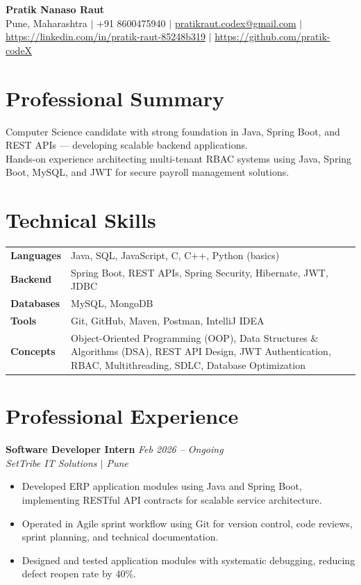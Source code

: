 \documentclass[10.5pt,a4paper]{article}
\begin{document}
\begin{center}
{\Large\bfseries Pratik Nanaso Raut}\\[2pt]
Pune, Maharashtra $|$ +91 8600475940 $|$ \href{mailto:pratikraut.codex@gmail.com}{pratikraut.codex@gmail.com} $|$ \href{https://linkedin.com/in/pratik-raut-85248b319}{https://linkedin.com/in/pratik-raut-85248b319} $|$ \href{https://github.com/pratik-codeX}{https://github.com/pratik-codeX}
\end{center}
\vspace{-2pt}
\section{Professional Summary}
Computer Science candidate with strong foundation in Java, Spring Boot, and REST APIs — developing scalable backend applications.\\[2pt]
Hands-on experience architecting multi-tenant RBAC systems using Java, Spring Boot, MySQL, and JWT for secure payroll management solutions.
\section{Technical Skills}
\begin{tabular}{@{}p{}p{}@{}}
\textbf{Languages} & Java, SQL, JavaScript, C, C++, Python (basics) \\[1pt]
\textbf{Backend} & Spring Boot, REST APIs, Spring Security, Hibernate, JWT, JDBC \\[1pt]
\textbf{Databases} & MySQL, MongoDB \\[1pt]
\textbf{Tools} & Git, GitHub, Maven, Postman, IntelliJ IDEA \\[1pt]
\textbf{Concepts} & Object-Oriented Programming (OOP), Data Structures \& Algorithms (DSA), REST API Design, JWT Authentication, RBAC, Multithreading, SDLC, Database Optimization \\
\end{tabular}
\section{Professional Experience}
\textbf{Software Developer Intern} \hfill \textit{Feb 2026 -- Ongoing}
\\\textit{SetTribe IT Solutions $|$ Pune}
\begin{itemize}
  \item Developed ERP application modules using Java and Spring Boot, implementing RESTful API contracts for scalable service architecture.
  \item Operated in Agile sprint workflow using Git for version control, code reviews, sprint planning, and technical documentation.
  \item Designed and tested application modules with systematic debugging, reducing defect reopen rate by 40\%.
\end{itemize}
\end{document}
